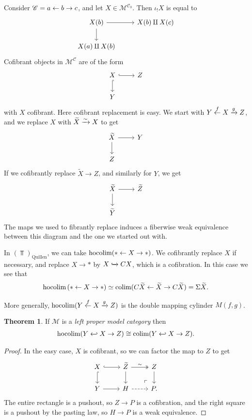 \documentclass[12pt]{amsart}
\let\til\widetilde
\theoremstyle{definition}
\newtheorem{theorem}{Theorem}[section]
\begin{document}
Consider $\mathscr{C} = a \leftarrow b \to c$, and let $X \in \mathcal{M}^{\mathscr{C}_0}$. Then $\iota_! X$ is equal to
\[ \begin{tikzcd}
    X(b)\rar\dar & X(b) \amalg X(c)\\
    X(a) \amalg X(b) & 
\end{tikzcd} \]
Cofibrant objects in $\mathcal{M}^{\mathscr{C}}$ are of the form
\[ \begin{tikzcd}
    X\rar[hook]\dar[hook] & Z\\
    Y & 
\end{tikzcd} \]
with $X$ cofibrant. Here cofibrant replacement is easy. We start with $Y \overset{f}{\leftarrow} X \xrightarrow{g} Z$, and we replace $X$ with $\til{X} \xto{\sim} X$ to get
\[ \begin{tikzcd}
    \til{X}\rar\dar & Y\\
    Z & 
\end{tikzcd} \]
If we cofibrantly replace $\til{X} \to Z$, and similarly for $Y$, we get
\[ \begin{tikzcd}
    \til{X}\rar\dar & \til{Z}\\
    \til{Y} & 
\end{tikzcd} \]
The maps we used to fibrantly replace induces a fiberwise weak equivalence between this diagram and the one we started out with.

In $(\Top)_\text{Quillen}$, we can take $\text{hocolim}(\ast \leftarrow X \to \ast)$. We cofibrantly replace $X$ if necessary, and replace $X \to \ast$ by $X \xhookrightarrow{} CX$, which is a cofibration. In this case we see that
\begin{align*}
    \hocolim \left( \ast \from X \to \ast \right) \simeq \colim (C \til{X} \from \til{X} \to C \til{X}) = \Sigma \til{X}.
\end{align*}

More generally, $\text{hocolim}(Y \overset{f}{\leftarrow} X \xrightarrow{g} Z)$ is the double mapping cylinder $M(f,g)$.

\begin{theorem} If $\mathcal{M}$ is a \textit{left proper model category} then
\begin{align*}
    \hocolim (Y \hookfrom X \to Z) \cong \colim(Y \hookfrom X \to Z).
\end{align*}
\end{theorem}
\begin{proof} In the easy case, $X$ is cofibrant, so we can factor the map to $Z$ to get
\[ \begin{tikzcd}
    X\rar[hook]\dar[hook] & \til{Z}\rar[two heads,"\sim"]\dar & Z\dar\\
    Y\rar & H\rar[dashed] & P\po.
\end{tikzcd} \]
The entire rectangle is a pushout, so $Z \to P$ is a cofibration, and the right square is a pushout by the pasting law, so $H \to P$ is a weak equivalence.
\end{proof}
\end{document}
